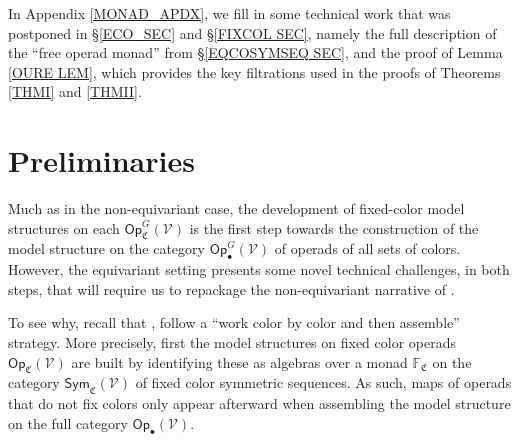 \documentclass[a4paper,10pt
,draft
]{article}%
\numberwithin{equation}{section}
\numberwithin{figure}{section}
\theoremstyle{definition} %
\newcommand{\Op}{\mathsf{Op}}%
\newcommand{\V}{\ensuremath{\mathcal V}}
\newcommand{\1}{\ensuremath{\mathbbm 1}}%
\begin{document}


In Appendix \ref{MONAD_APDX},
we fill in some technical work that was postponed in \S \ref{ECO_SEC} and \S \ref{FIXCOL SEC},
namely the full description of the ``free operad monad''
from \S \ref{EQCOSYMSEQ SEC},
and the proof of Lemma \ref{OURE LEM},
which provides the key filtrations used in the proofs of
Theorems \ref{THMI} and \ref{THMII}.
 




\section{Preliminaries}\label{PRE SEC}


Much as in the non-equivariant case,
the development of fixed-color model structures on each $\Op_{\mathfrak C}^G(\V)$
is the first step towards the
construction of the model structure on the category $\Op_\bullet^G(\V)$ of operads of all sets of colors.
However, the equivariant setting presents some novel
technical challenges, in both steps, that will
require us to repackage the non-equivariant narrative of \cite{CM13b,Cav}.


To see why, recall that \cite{CM13b},\cite{Cav}
follow a ``work color by color and then assemble'' strategy.
More precisely, first the model structures on fixed color operads 
$\mathsf{Op}_{\mathfrak{C}}(\V)$
are built by identifying these as algebras over a monad
$\mathbb{F}_{\mathfrak{C}}$
on the category $\mathsf{Sym}_{\mathfrak{C}}(\V)$
of fixed color symmetric sequences.
As such, maps of operads that do not fix colors
only appear afterward when assembling the model structure on the full category $\mathsf{Op}_{\bullet}(\V)$.
\end{document}
